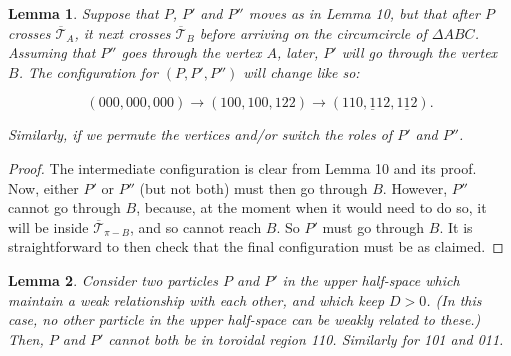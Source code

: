 \documentclass[a4paper, twoside]{article}
\newtheorem{lemma}{Lemma}
\begin{document}
\begin{lemma}

Suppose that $P$, $P'$ and $P''$ moves as in Lemma 10, but that after $P$ crosses $\overline{\mathcal{T}}_A$, it next crosses $\overline{\mathcal{T}}_B$ before arriving on the circumcircle of $\Delta ABC$. Assuming that $P''$ goes through the vertex $A$, later, $P'$ will go through the vertex $B$. The configuration for $(P, P', P'')$ will change like so: 

\vspace{-2mm} 

$$(000, 000, 000) \rightarrow (100, 100, 122) \rightarrow (110, \underline{1}12, 1\underline{1}2). $$

\vspace{2mm} 

\noindent Similarly, if we permute the vertices and/or switch the roles of $P'$ and $P''$. 

\end{lemma}

\begin{proof}

The intermediate configuration is clear from Lemma 10 and its proof. Now, either $P'$ or $P''$ (but not both) must then go through $B$. However, $P''$ cannot go through $B$, because, at the moment when it would need to do so, it will be inside $\overline{\mathcal{T}}_{\pi-B}$, and so cannot reach $B$. So $P'$ must go through $B$. It is straightforward to then check that the final configuration must be as claimed. 

\end{proof}

\vspace{2mm}

\begin{lemma}

Consider two particles $P$ and $P'$ in the upper half-space which maintain a weak relationship with each other, and which keep $D > 0$. (In this case, no other particle in the upper half-space can be weakly related to these.) Then, $P$ and $P'$ cannot both be in toroidal region 110. Similarly for 101 and 011. \\ 

\end{lemma}
\end{document}
